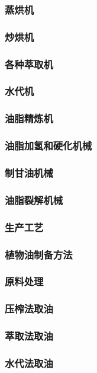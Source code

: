 \documentclass[UTF8]{../../ApplicationUniverse}
\begin{document}
    \subsubsection{蒸烘机}
    \subsubsection{炒烘机}
    \subsubsection{各种萃取机}
    \subsubsection{水代机}
    \subsubsection{油脂精炼机}
    \subsubsection{油脂加氢和硬化机械}
    \subsubsection{制甘油机械}
    \subsubsection{油脂裂解机械}
\subsubsection{生产工艺}
    \subsubsection{植物油制备方法}
        \subsubsection{原料处理}
        \subsubsection{压榨法取油}
        \subsubsection{萃取法取油}
        \subsubsection{水代法取油}
\end{document}
